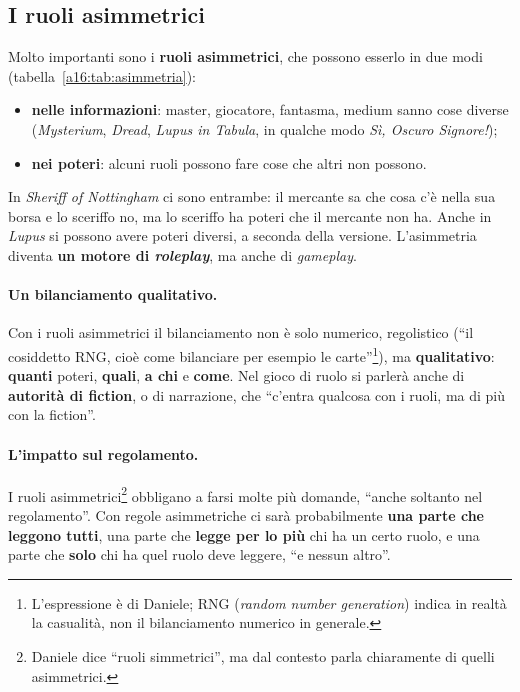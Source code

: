 \subsection{I ruoli asimmetrici}



Molto importanti sono i \textbf{ruoli asimmetrici}, che possono esserlo in due modi
(tabella~\ref{a16:tab:asimmetria}):
\begin{itemize}
  \item \textbf{nelle informazioni}: master, giocatore, fantasma, medium sanno cose diverse
        (\emph{Mysterium}, \emph{Dread}, \emph{Lupus in Tabula}, in qualche modo \emph{Sì, Oscuro
        Signore!});
  \item \textbf{nei poteri}: alcuni ruoli possono fare cose che altri non possono.
\end{itemize}
In \emph{Sheriff of Nottingham} ci sono entrambe: il mercante sa che cosa c'è nella sua borsa e
lo sceriffo no, ma lo sceriffo ha poteri che il mercante non ha. Anche in \emph{Lupus} si possono
avere poteri diversi, a seconda della versione. L'asimmetria diventa \textbf{un motore di
\emph{roleplay}}, ma anche di \emph{gameplay}.

\paragraph{Un bilanciamento qualitativo.} Con i ruoli asimmetrici il bilanciamento non è solo
numerico, regolistico (``il cosiddetto RNG, cioè come bilanciare per esempio le
carte''\footnote{L'espressione è di Daniele; RNG (\emph{random number generation}) indica in
realtà la casualità, non il bilanciamento numerico in generale.}), ma \textbf{qualitativo}:
\textbf{quanti} poteri, \textbf{quali}, \textbf{a chi} e \textbf{come}. Nel gioco di ruolo si
parlerà anche di \textbf{autorità di fiction}, o di narrazione, che ``c'entra qualcosa con i
ruoli, ma di più con la fiction''.

\paragraph{L'impatto sul regolamento.} I ruoli asimmetrici\footnote{Daniele dice ``ruoli
simmetrici'', ma dal contesto parla chiaramente di quelli asimmetrici.} obbligano a farsi molte
più domande, ``anche soltanto nel regolamento''. Con regole asimmetriche ci sarà probabilmente
\textbf{una parte che leggono tutti}, una parte che \textbf{legge per lo più} chi ha un certo
ruolo, e una parte che \textbf{solo} chi ha quel ruolo deve leggere, ``e nessun altro''.

